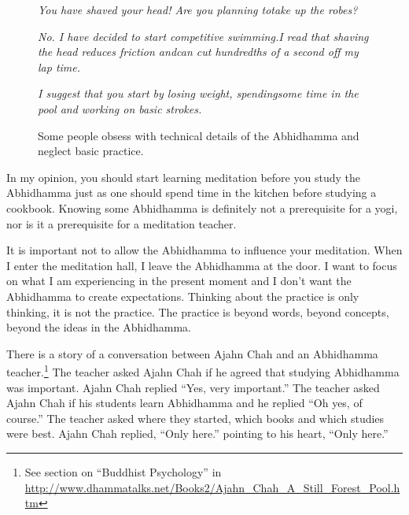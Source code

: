 \begin{figure}[H]
\begin{quoting}
\begin{flushleft}
\textit{You have shaved your head! Are you planning to\newline take up the robes?}
\end{flushleft}
\begin{flushright}
\textit{No. I have decided to start competitive swimming.\linebreak I read that shaving the head reduces friction and\linebreak can cut hundredths of a second off my lap time. }
\end{flushright}
\begin{flushleft}
\textit{I suggest that you start by losing weight, spending\newline some time in the pool and working on basic strokes.}
\end{flushleft}
\end{quoting}
\caption{Some people obsess with technical details of the Abhidhamma and neglect basic practice.}
\label{fig:Swimming}
\end{figure}

In my opinion, you should start learning meditation before you study the Abhidhamma just as one should spend time in the kitchen before studying a cookbook. Knowing some Abhidhamma is definitely not a prerequisite for a yogi, nor is it a prerequisite for a meditation teacher.

It is important not to allow the Abhidhamma to influence your meditation. When I enter the meditation hall, I leave the Abhidhamma at the door. I want to focus on what I am experiencing in the present moment and I don’t want the Abhidhamma to create expectations. Thinking about the practice is only thinking, it is not the practice. The practice is beyond words, beyond concepts, beyond the ideas in the Abhidhamma.

There is a story of a conversation between Ajahn Chah and an Abhidhamma teacher.\footnote{See section on “Buddhist Psychology” in \url{http://www.dhammatalks.net/Books2/Ajahn_Chah_A_Still_Forest_Pool.htm}} The teacher asked Ajahn Chah if he agreed that studying Abhidhamma was important. Ajahn Chah replied “Yes, very important.” The teacher asked Ajahn Chah if his students learn Abhidhamma and he replied “Oh yes, of course.” The teacher asked where they started, which books and which studies were best. Ajahn Chah replied, “Only here.” pointing to his heart, “Only here.”

